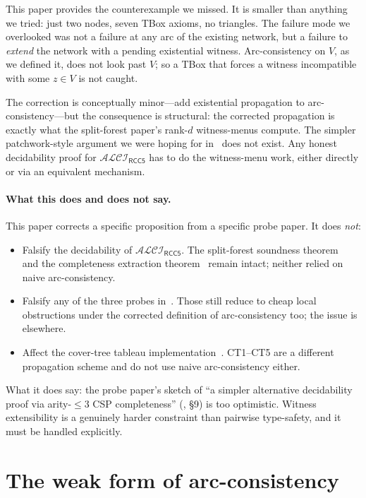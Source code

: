 \documentclass[11pt]{article}
\theoremstyle{definition}
\theoremstyle{remark}
\newcommand{\ALCIRCC}[1]{\mathcal{ALCI}_{\mathsf{RCC#1}}}
\begin{document}
This paper provides the counterexample we missed.  It is smaller than
anything we tried: just two nodes, seven TBox axioms, no triangles.
The failure mode we overlooked was not a failure at any arc of the
existing network, but a failure to \emph{extend} the network with a
pending existential witness.  Arc-consistency on $V$, as we defined
it, does not look past $V$; so a TBox that forces a witness
incompatible with some $z \in V$ is not caught.

The correction is conceptually minor---add existential propagation to
arc-consistency---but the consequence is structural: the corrected
propagation is exactly what the split-forest paper's rank-$d$
witness-menus compute.  The simpler patchwork-style argument we were
hoping for in~\cite{PatchworkProbe} does not exist.  Any honest
decidability proof for $\ALCIRCC{5}$ has to do the witness-menu
work, either directly or via an equivalent mechanism.

\paragraph{What this does and does not say.}
This paper corrects a specific proposition from a specific probe
paper.  It does \emph{not}:
\begin{itemize}
  \item Falsify the decidability of $\ALCIRCC{5}$.  The split-forest
    soundness theorem~\cite{SplitForest} and the completeness
    extraction theorem~\cite{CompletenessExtraction} remain
    intact; neither relied on naive arc-consistency.
  \item Falsify any of the three probes in~\cite{PatchworkProbe}.
    Those still reduce to cheap local obstructions under the
    corrected definition of arc-consistency too; the issue is
    elsewhere.
  \item Affect the cover-tree tableau implementation~\cite{CoverTree}.
    CT1--CT5 are a different propagation scheme and do not use naive
    arc-consistency either.
\end{itemize}

What it does say: the probe paper's sketch of ``a simpler alternative
decidability proof via arity-$\leq 3$ CSP completeness''
(\cite{PatchworkProbe}, \S9) is too optimistic.  Witness
extensibility is a genuinely harder constraint than pairwise
type-safety, and it must be handled explicitly.

\section{The weak form of arc-consistency}
\label{sec:weak}
\end{document}
